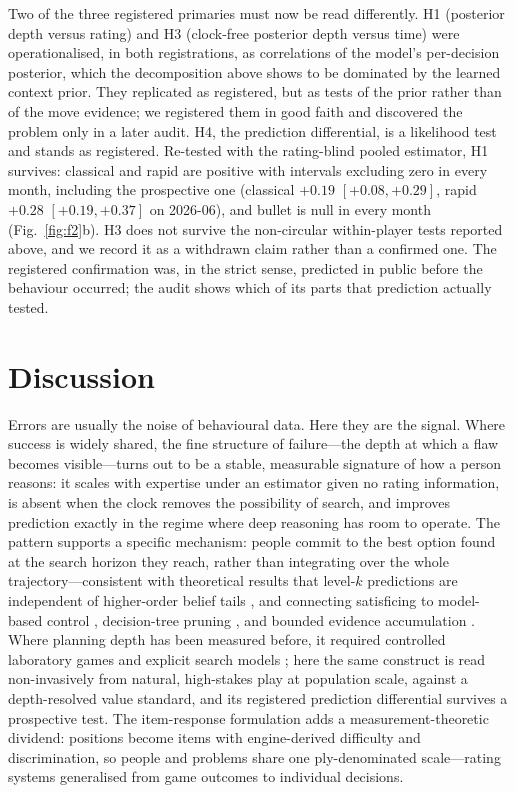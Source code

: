 Two of the three registered primaries must now be read differently. H1 (posterior depth
versus rating) and H3 (clock-free posterior depth versus time) were operationalised, in both
registrations, as correlations of the model's per-decision posterior, which the decomposition
above shows to be dominated by the learned context prior. They replicated as registered, but
as tests of the prior rather than of the move evidence; we registered them in good faith and
discovered the problem only in a later audit. H4, the prediction differential, is a likelihood
test and stands as registered. Re-tested with the rating-blind pooled estimator, H1 survives: classical and rapid are
positive with intervals excluding zero in every month, including the prospective one
(classical $+0.19$ $[+0.08,+0.29]$, rapid $+0.28$ $[+0.19,+0.37]$ on 2026-06), and bullet is
null in every month (Fig.~\ref{fig:f2}b).
H3 does not survive the non-circular within-player tests reported above, and we record it as a
withdrawn claim rather than a confirmed one. The registered confirmation was, in the strict
sense, predicted in public before the behaviour occurred; the audit shows which of its parts
that prediction actually tested.

\section{Discussion}
Errors are usually the noise of behavioural data. Here they are the signal. Where success is
widely shared, the fine structure of failure---the depth at which a flaw becomes
visible---turns out to be a stable, measurable signature of how a person reasons: it scales
with expertise under an estimator given no rating information, is absent when the clock
removes the possibility of search, and improves prediction exactly in the regime where deep
reasoning has room to operate. The
pattern supports a specific mechanism: people commit to the best option found at the search
horizon they reach, rather than integrating over the whole trajectory---consistent with
theoretical results that level-$k$ predictions are independent of higher-order belief tails
\citep{strzalecki2014}, and connecting satisficing to model-based control \citep{daw2005},
decision-tree pruning \citep{huys2012}, and bounded evidence accumulation
\citep{ratcliff2008}. Where planning depth has been measured before, it required controlled
laboratory games and explicit search models \citep{callaway2022,vanopheusden2023}; here the
same construct is read non-invasively from natural, high-stakes play at population scale,
against a depth-resolved value standard, and its registered prediction differential survives
a prospective test. The
item-response formulation adds a measurement-theoretic dividend: positions become items with
engine-derived difficulty and discrimination, so people and problems share one ply-denominated
scale---rating systems generalised from game outcomes to individual decisions.

